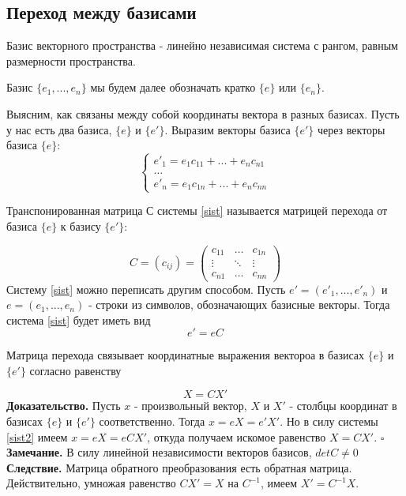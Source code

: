 \subsection{Переход между базисами}
\begin{defin}
Базис векторного пространства - линейно независимая система с рангом, равным
размерности пространства.
\end{defin}
Базис $\{e_1,...,e_n\}$ мы будем далее обозначать кратко $\{e\}$ или $\{e_n\}$. 

Выясним, как связаны между собой координаты вектора в разных базисах. Пусть у
нас есть два базиса, $\{e\}$ и $\{e'\}$. Выразим векторы базиса $\{e'\}$ через
векторы базиса $\{e\}$: 
\begin{equation}\begin{cases}e'_1=e_1c_{11}+...+e_nc_{n1}\\
\dots\\e'_n=e_1c_{1n}+...+e_nc_{nn}
\end{cases}\label{sist}\end{equation}

\begin{defin}
Транспонированная матрица С системы \ref{sist} называется матрицей перехода от
базиса $\{e\}$ к базису $\{e'\}$:
\end{defin}
$$C=(c_{ij})=\begin{pmatrix}c_{11}&\dots&c_{1n}\\\vdots&\ddots&\vdots\\c_{n1}
&\dots&c_{nn}\end{pmatrix}$$ 
Систему \ref{sist} можно переписать другим способом. Пусть $e'=(e'_1,...,e'_n)$
и $e=(e_1,...,e_n)$ -  строки из символов, обозначающих базисные векторы. Тогда
система \ref{sist} будет иметь вид
\begin{equation}e'=eC\label{sist2}\end{equation}
\begin{theor}
Матрица перехода связывает координатные выражения вектороа в базисах $\{e\}$ 
и $\{e'\}$ согласно равенству
\end{theor}
$$X=CX'$$
\textbf{Доказательство.} 
Пусть $x$ - произвольный вектор, $X$ и $X'$ - столбцы координат в базисах
$\{e\}$ и $\{e'\}$ соответственно. Тогда $x=eX=e'X'$. Но в силу системы 
\ref{sist2} имеем $x=eX=eCX'$, откуда получаем искомое равенство
$X=CX'$. $\square$ \\
\textbf{Замечание.} В силу линейной независимости векторов базисов, 
$det C\ne 0$\\
\textbf{Следствие.} Матрица обратного преобразования есть обратная матрица.
Действительно, умножая равенство $CX'=X$ на $C^{-1}$, имеем $X'=C^{-1}X$.

